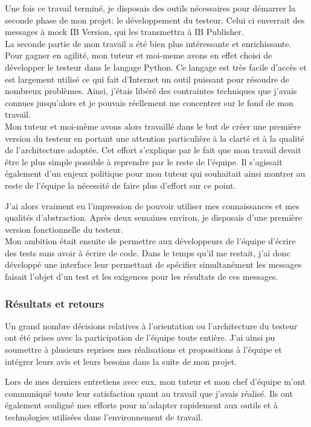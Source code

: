 \documentclass[11pt, oneside, titlepage, a4paper]{article}
\begin{document}
Une fois ce travail terminé, je disposais des outils nécessaires pour démarrer la seconde phase de mon projet: le développement du testeur. Celui ci enverrait des messages à mock IB Version, qui les transmettra à IB Publisher.
\\

La seconde partie de mon travail a été bien plus intéressante et enrichissante. Pour gagner en agilité, mon tuteur et moi-meme avons en effet choisi de développer le testeur dans le langage Python. Ce langage est très facile d'accès et est largement utilisé ce qui fait d'Internet un outil puissant pour résoudre de nombreux problèmes. Ainsi, j'étais libéré des contraintes techniques que j'avais connues jusqu'alors et je pouvais réellement me concentrer sur le fond de mon travail.
\\
Mon tuteur et moi-même avons alors travaillé dans le but de créer une première version du testeur en portant une attention particulière à la clarté et à la qualité de l'architecture adoptée. Cet effort s'explique par le fait que mon travail devait être le plus simple possible à reprendre par le reste de l'équipe. Il s'agissait également d'un enjeux \og politique \fg{} pour mon tuteur qui souhaitait ainsi montrer au reste de l'équipe la nécessité de faire plus d'effort sur ce point.

J'ai alors vraiment eu l'impression de pouvoir utiliser mes connaissances et mes qualités d'abstraction. Après deux semaines environ, je disposais d'une première version fonctionnelle du testeur.
\\

Mon ambition était ensuite de permettre aux développeurs de l'équipe d'écrire des tests sans avoir à écrire de code. Dans le temps qu'il me restait, j'ai donc développé une interface leur permettant de spécifier simultanément les messages faisait l'objet d'un test et les exigences pour les résultats de ces messages.
		\subsubsection{Résultats et retours}
Un grand nombre décisions relatives à l'orientation ou l'architecture du testeur ont été prises avec la participation de l'équipe toute entière. J'ai ainsi pu soumettre à plusieurs reprises mes réalisations et propositions à l'équipe et intégrer leurs avis et leurs besoins dans la suite de mon projet.

Lors de mes derniers entretiens avec eux, mon tuteur et mon chef d'équipe m'ont communiqué toute leur satisfaction quant au travail que j'avais réalisé. Ils ont également souligné mes efforts pour m'adapter rapidement aux outils et à technologies utilisées dans l'environnement de travail.
\end{document}
